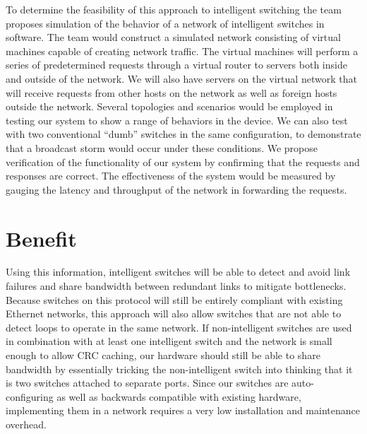 \documentclass{article}
\begin{document}
	To determine the feasibility of this approach to intelligent switching the team proposes simulation of the behavior of a network of intelligent switches in software.
	The team would construct a simulated network consisting of virtual machines capable of creating network traffic.
	The virtual machines will perform a series of predetermined requests through a virtual router to servers both inside and outside of the network.
	We will also have servers on the virtual network that will receive requests from other hosts on the network as well as foreign hosts outside the network.
	Several topologies and scenarios would be employed in testing our system to show a range of behaviors in the device.
	We can also test with two conventional ``dumb'' switches in the same configuration, to demonstrate that a broadcast storm would occur under these conditions.
	We propose verification of the functionality of our system by confirming that the requests and responses are correct.
	The effectiveness of the system would be measured by gauging the latency and throughput of the network in forwarding the requests.
\section{Benefit}
	Using this information, intelligent switches will be able to detect and avoid link failures and share bandwidth between redundant links to mitigate bottlenecks.
	Because switches on this protocol will still be entirely compliant with existing Ethernet networks, this approach will also allow switches that are not able to detect loops to operate in the same network.
	If non-intelligent switches are used in combination with at least one intelligent switch and the network is small enough to allow CRC caching, our hardware should still be able to share bandwidth by essentially tricking the non-intelligent switch into thinking that it is two switches attached to separate ports.
	Since our switches are auto-configuring as well as backwards compatible with existing hardware, implementing them in a network requires a very low installation and maintenance overhead.
\end{document}
